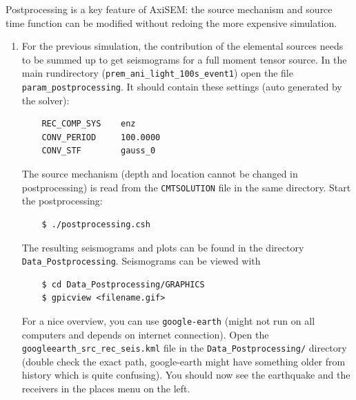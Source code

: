 \documentclass{article}
\begin{document}
Postprocessing is a key feature of AxiSEM: the source mechanism and source time function
can be modified without redoing the more expensive simulation.

\begin{enumerate}
    \item For the previous simulation, the contribution of the elemental sources needs
    to be summed up to get seismograms for a full moment tensor source. In the
    main rundirectory (\verb|prem_ani_light_100s_event1|) open the file
    \verb|param_postprocessing|. It should contain these settings (auto generated by the
    solver):
    \begin{verbatim}
    REC_COMP_SYS    enz
    CONV_PERIOD     100.0000
    CONV_STF        gauss_0
    \end{verbatim}
    The source mechanism (depth and location cannot be changed in postprocessing) is read
    from the \verb|CMTSOLUTION| file in the same directory. Start the postprocessing:
    \begin{verbatim}
    $ ./postprocessing.csh
    \end{verbatim}
    The resulting seismograms and plots can be found in the directory 
    \verb|Data_Postprocessing|. Seismograms can be viewed with
    \begin{verbatim}
    $ cd Data_Postprocessing/GRAPHICS
    $ gpicview <filename.gif>
    \end{verbatim}
    For a nice overview, you can use \verb|google-earth| (might not run on all computers
    and depends on internet connection). Open the \verb|googleearth_src_rec_seis.kml| file
    in the \verb|Data_Postprocessing/| directory (double check the exact path,
    google-earth might have something older from history which is quite confusing).
    You should now see the earthquake and the receivers in the places menu on the left.
    

\end{enumerate}
\end{document}
